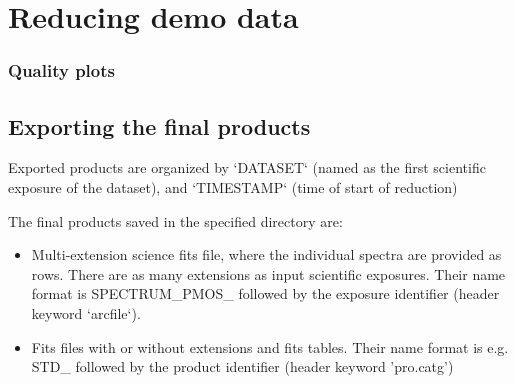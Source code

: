 
\section{Reducing demo data}
\label{sec:reducing_demo_data}



 
\subsubsection{Quality plots}


\subsection{Exporting the final products}
\label{sec:export_final_products}



 
 
Exported products are organized by `DATASET` (named as the first
scientific exposure of the dataset), and `TIMESTAMP` (time of start of
reduction)

The final products saved in the specified directory are: 

\begin{itemize}
\item Multi-extension science fits file, where the individual spectra are provided as rows. There are as many extensions as input scientific exposures. 
Their name format is SPECTRUM\_PMOS\_ followed by the exposure identifier (header keyword ‘arcfile‘).
\item Fits files with or without extensions and fits tables. Their name format is e.g. STD\_ followed by the product identifier (header keyword 'pro.catg')
\end{itemize}

